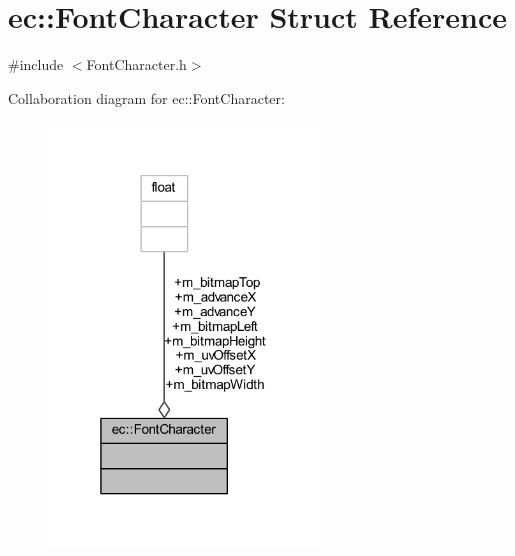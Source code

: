 \hypertarget{structec_1_1_font_character}{}\section{ec\+:\+:Font\+Character Struct Reference}
\label{structec_1_1_font_character}


{\ttfamily \#include $<$Font\+Character.\+h$>$}



Collaboration diagram for ec\+:\+:Font\+Character\+:\nopagebreak
\begin{figure}[H]
\begin{center}
\leavevmode
\includegraphics[width=205pt]{structec_1_1_font_character__coll__graph}
\end{center}
\end{figure}

